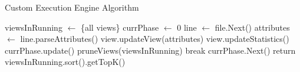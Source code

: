 


\begin{algorithm}
\caption{Custom Execution Engine Algorithm}
\label{algo:custom_exec_engine}
\begin{algorithmic}[1]
\State viewsInRunning $\gets$ \{all views\}
\State currPhase $\gets$ 0
\State line $\gets$ file.Next()
\State attributes $\gets$ line.parseAttributes()
\State view.updateView(attributes)
\State view.updateStatistics()
\EndFor
\State currPhase.update()
\State pruneViews(viewsInRunning)
\State break
\EndIf
\State currPhase.Next()
\EndIf
\EndWhile
\State return viewsInRunning.sort().getTopK()
\end{algorithmic}
\end{algorithm}

